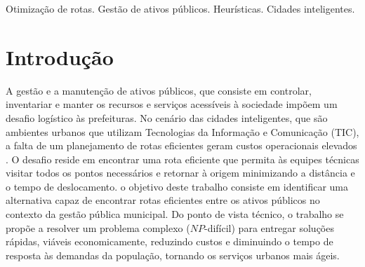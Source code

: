 \documentclass[conference,12pt]{IEEEtran}
\begin{document}
\begin{IEEEkeywords}
    Otimização de rotas. Gestão de ativos públicos. Heurísticas. Cidades inteligentes.
\end{IEEEkeywords}

\vspace{-0.3cm}
\section{Introdução}
A gestão e a manutenção de ativos públicos, que consiste em controlar, inventariar e manter
os recursos e serviços acessíveis à sociedade impõem um desafio logístico às prefeituras.
No cenário das cidades inteligentes, que são ambientes urbanos que utilizam Tecnologias
da Informação e Comunicação (TIC), a falta de um planejamento
de rotas eficientes geram custos
operacionais elevados \cite{SANTIAGO2023}. O desafio reside em encontrar uma
rota eficiente que permita às equipes técnicas visitar todos os pontos
necessários e retornar à origem minimizando a distância e o tempo de
deslocamento. o objetivo deste trabalho consiste em identificar
uma alternativa capaz de encontrar rotas
eficientes entre os ativos públicos no contexto da
gestão pública municipal.
Do ponto de vista técnico, o trabalho se propõe a resolver
um problema complexo ($NP$-difícil)
para entregar soluções rápidas, viáveis economicamente, reduzindo custos e
diminuindo o tempo de resposta às demandas da população, tornando
os serviços urbanos mais ágeis.



\end{document}

